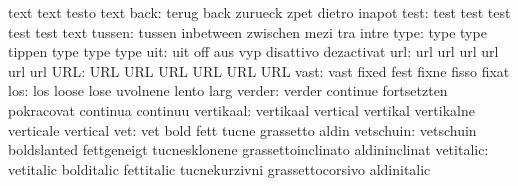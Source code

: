                            text                      text
                           testo                     text
                     back: terug                     back
                           zurueck                   zpet
                           dietro                    inapot
                     test: test                      test
                           test                      test
                           test                      text
                   tussen: tussen                    inbetween
                           zwischen                  mezi
                           tra                       intre
                     type: type                      type
                           tippen                    type
                           type                      type %
                      uit: uit                       off
                           aus                       vyp
                           disattivo                 dezactivat
                      url: url                       url
                           url                       url
                           url                       url
                      URL: URL                       URL
                           URL                       URL
                           URL                       URL
                     vast: vast                      fixed
                           fest                      fixne
                           fisso                     fixat
                      los: los                       loose
                           lose                      uvolnene
                           lento                     larg
                   verder: verder                    continue
                           fortsetzten               pokracovat
                           continua                  continuu
                vertikaal: vertikaal                 vertical
                           vertikal                  vertikalne
                           verticale                 vertical
                      vet: vet                       bold
                           fett                      tucne
                           grassetto                 aldin
                vetschuin: vetschuin                 boldslanted
                           fettgeneigt               tucnesklonene
                           grassettoinclinato        aldininclinat
                vetitalic: vetitalic                 bolditalic
                           fettitalic                tucnekurzivni
                           grassettocorsivo          aldinitalic
